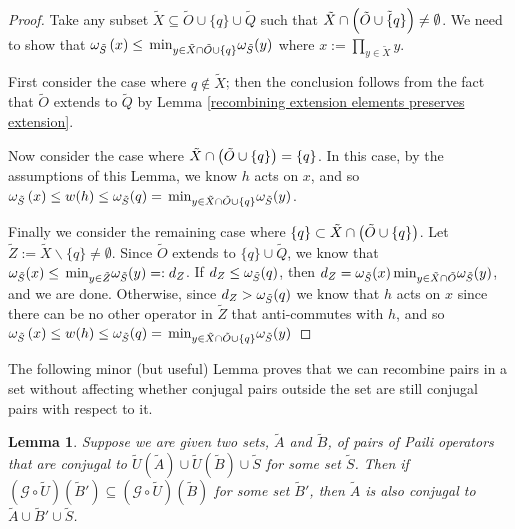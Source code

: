 \documentclass[twocolumn,showpacs,preprintnumbers,amsmath,amssymb,nofootinbib,pra,floatfix]{revtex4-1}
\newtheorem{lemma}{Lemma}
\newenvironment{remark}[1][Remark]{\begin{trivlist}
\item[\hskip \labelsep {\bfseries #1}]}{\end{trivlist}}
\newcommand{\set}{\tilde}
\newcommand{\genfun}{\mathcal{G}}
\begin{document}
\begin{proof}
Take any subset $\set X\subseteq \set O\cup\{q\}\cup\set Q$ such that $\set X\cap\paren{\set O\cup\set \{q\}}\ne\emptyset$.  We need to show that $\om_{\set S}\paren{x} \le \min_{y\in\set X\cap\set O\cup\{q\}}\om_{\set S}(y)$ where $x:=\prod_{y\in \set X} y$.

First consider the case where $q\notin \set X$;  then the conclusion follows from the fact that $\set O$ extends to $\set Q$ by Lemma \ref{recombining extension elements preserves extension}.

Now consider the case where $\set X\cap\paren{\set O\cup\{q\}}=\{q\}$.  In this case, by the assumptions of this Lemma, we know $h$ acts on $x$, and so $\om_{\set S}\paren{x} \le w(h)\le\om_{\set S}(q)=\min_{y\in\set X\cap\set O\cup\{q\}}\om_{\set S}(y)$.

Finally we consider the remaining case where $\{q\}\subset\set X\cap\paren{\set O\cup\{q\}}$. Let $\set Z := \set X\backslash\{q\}\ne\emptyset$.  Since $\set O$ extends to $\{q\}\cup\set Q$, we know that $\om_{\set S}(x)\le \min_{y\in\set Z}\om_{\set S}(y)=:d_Z$.  If $d_Z \le \om_{\set S}(q)$, then $d_Z=\om_{\set S}(x)\min_{y\in\set X\cap\set O}\om_{\set S}(y)$, and we are done.  Otherwise, since $d_Z> \om_{\set S}(q)$ we know that $h$ acts on $x$ since there can be no other operator in $\set Z$ that anti-commutes with $h$, and so $\om_{\set S}\paren{x} \le w(h)\le\om_{\set S}(q)=\min_{y\in\set X\cap\set O\cup\{q\}}\om_{\set S}(y)$
\end{proof}
\begin{remark}
The following minor (but useful) Lemma proves that we can recombine pairs in a set without affecting whether conjugal pairs outside the set are still conjugal pairs with respect to it.
\end{remark}

\begin{lemma}
\label{recombining elements preserves conjugal property for third parties}
Suppose we are given two sets, $\set A$ and $\set B$, of pairs of Paili operators that are conjugal to $\set U(\set A) \cup \set U(\set B) \cup \set S$ for some set $\set S$.  Then if $(\genfun\circ \set U)(\set B')\subseteq(\genfun\circ \set U)(\set B)$ for some set $\set B'$, then $\set A$ is also conjugal to $\set A \cup \set B' \cup\set S$.
\end{lemma}
\end{document}
